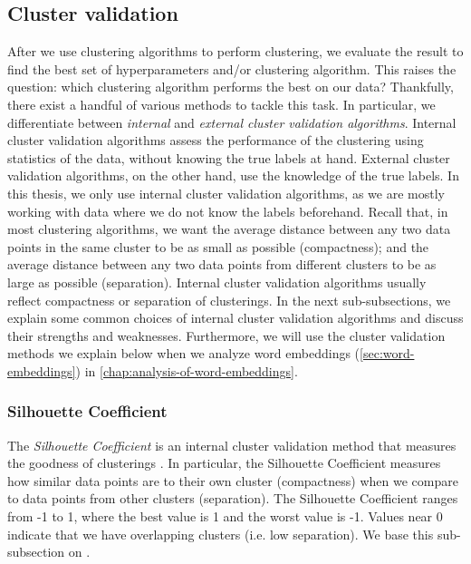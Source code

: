 \subsection{Cluster validation}
\label{sec:cluster-validation}
After we use clustering algorithms to perform clustering, we evaluate the result to find the best set of hyperparameters and/or clustering algorithm. This raises the question: which clustering algorithm performs the best on our data? Thankfully, there exist a handful of various methods to tackle this task. In particular, we differentiate between \textit{internal} and \textit{external cluster validation algorithms}. Internal cluster validation algorithms assess the performance of the clustering using statistics of the data, without knowing the true labels at hand. External cluster validation algorithms, on the other hand, use the knowledge of the true labels. In this thesis, we only use internal cluster validation algorithms, as we are mostly working with data where we do not know the labels beforehand. Recall that, in most clustering algorithms, we want the average distance between any two data points in the same cluster to be as small as possible (compactness); and the average distance between any two data points from different clusters to be as large as possible (separation). Internal cluster validation algorithms usually reflect compactness or separation of clusterings. In the next sub-subsections, we explain some common choices of internal cluster validation algorithms and discuss their strengths and weaknesses. Furthermore, we will use the cluster validation methods we explain below when we analyze word embeddings (\cref{sec:word-embeddings}) in \cref{chap:analysis-of-word-embeddings}.

\subsubsection{Silhouette Coefficient}
\label{sec:silhouette-coefficient}
The \textit{Silhouette Coefficient} is an internal cluster validation method that measures the goodness of clusterings \cite[p. 87]{Kaufman1990}. In particular, the Silhouette Coefficient measures how similar data points are to their own cluster (compactness) when we compare to data points from other clusters (separation). The Silhouette Coefficient ranges from -1 to 1, where the best value is 1 and the worst value is -1. Values near 0 indicate that we have overlapping clusters (i.e. low separation). We base this sub-subsection on \cite[p. 87]{Kaufman1990}.

